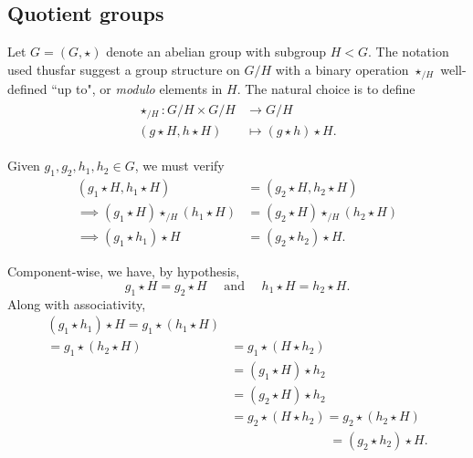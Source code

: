 \documentclass[../algebraNotesMSRI-UP2016.tex]{subfiles}
\begin{document}
\subsection[\subsecname]{Quotient groups}
\begin{frame}{\subsecname}
Let $G=(G,\star)$ denote an abelian group with subgroup $H< G$.  The notation used thusfar suggest a group structure on $G/H$ with a binary operation $\star_{/H}$ well-defined ``up to", or \emph{modulo} elements in $H$.  The natural choice is to define
\begin{gather}\label{eq:quotientOperation}
\begin{split}
\star_{/H}: G/H\times G/H &\to G/H \\
(g\star H,h\star H) &\mapsto (g\star h)\star H.
\end{split}
\end{gather} 

\smallGap
Given $g_1,g_2,h_1,h_2\in G$, we must verify 
\begin{align*}
(g_1\star H,h_1\star H) &=(g_2\star H,h_2\star H) \\
\implies (g_1\star H)\star_{/H}(h_1\star H) &=(g_2\star H)\star_{/H}(h_2\star H) \\
\implies (g_1\star h_1)\star H &= (g_2\star h_2)\star H.
\end{align*}
\end{frame}

\begin{frame}
Component-wise, we have, by hypothesis,%
\[
g_1\star H=g_2\star H\quad\text{ and }\quad h_1\star H=h_2\star H.
\]
Along with associativity,
\begin{align*}
(g_1\star h_1)\star H = g_1\star(h_1\star H) \\
	= g_1\star(h_2\star H) &= g_1\star(H\star h_2) %
	\\
	&= (g_1\star H)\star h_2 \\
	&= (g_2\star H)\star h_2 \\
	&= g_2\star (H\star h_2) = g_2\star (h_2\star H) %
	\\
	&\phantom{= g_2\star (H\star h_2)} \;=(g_2\star h_2)\star H.
\end{align*}
\end{frame}
\end{document}
